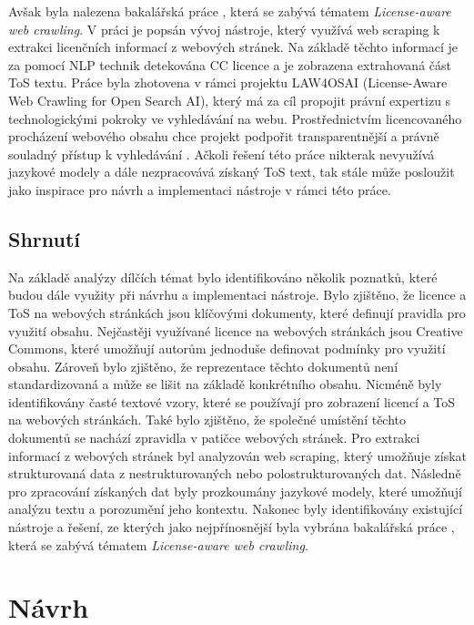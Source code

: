 Avšak byla nalezena bakalářská práce \cite{essay100804}, která se zabývá tématem \textit{License-aware web crawling}.
V práci je popsán vývoj nástroje, který využívá web scraping k extrakci licenčních informací z webových stránek.
Na základě těchto informací je za pomocí NLP technik detekována CC licence a je zobrazena extrahovaná část ToS textu.
Práce byla zhotovena v rámci projektu LAW4OSAI (License-Aware Web Crawling for Open Search AI), který má za cíl propojit právní expertizu s technologickými pokroky ve vyhledávání na webu.
Prostřednictvím licencovaného procházení webového obsahu chce projekt podpořit transparentnější a právně souladný přístup k vyhledávání \cite{openwebsearchProjectLAW4OSAI}. 
Ačkoli řešení této práce nikterak nevyužívá jazykové modely a dále nezpracovává získaný ToS text, tak stále může posloužit jako inspirace pro návrh a implementaci nástroje v rámci této práce.

\section{Shrnutí}
Na základě analýzy dílčích témat bylo identifikováno několik poznatků, které budou dále využity při návrhu a implementaci nástroje.
Bylo zjištěno, že licence a ToS na webových stránkách jsou klíčovými dokumenty, které definují pravidla pro využití obsahu.
Nejčastěji využívané licence na webových stránkách jsou Creative Commons, které umožňují autorům jednoduše definovat podmínky pro využití obsahu.
Zároveň bylo zjištěno, že reprezentace těchto dokumentů není standardizovaná a může se lišit na základě konkrétního obsahu.
Nicméně byly identifikovány časté textové vzory, které se používají pro zobrazení licencí a ToS na webových stránkách.
Také bylo zjištěno, že společné umístění těchto dokumentů se nachází zpravidla v patičce webových stránek.
Pro extrakci informací z webových stránek byl analyzován web scraping, který umožňuje získat strukturovaná data z nestrukturovaných nebo polostrukturovaných dat.
Následně pro zpracování získaných dat byly prozkoumány jazykové modely, které umožňují analýzu textu a porozumění jeho kontextu.
Nakonec byly identifikovány existující nástroje a řešení, ze kterých jako nejpřínosnější byla vybrána bakalářská práce \cite{essay100804}, která se zabývá tématem \textit{License-aware web crawling}.

\chapter{Návrh}

